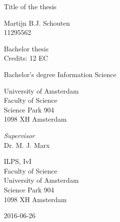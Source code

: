 \begin{center}

\vspace{2.5cm}

\begin{Huge}
Title of the thesis
\end{Huge}

\vspace{1.5cm}

Martijn B.J. Schouten\\
11295562

\vspace{1.5cm}

Bachelor thesis\\
Credits: 12 EC

\vspace{0.5cm}

Bachelor's degree Information Science

\vspace{0.25cm}

University of Amsterdam\\
Faculty of Science\\
Science Park 904\\
1098 XH Amsterdam

\vspace{4cm}

\emph{Supervisor}\\
Dr. M. J. Marx

\vspace{0.25cm}

ILPS, IvI\\
Faculty of Science\\
University of Amsterdam\\
Science Park 904\\
1098 XH Amsterdam

\vspace{1.5cm}

2016-06-26

\end{center}
